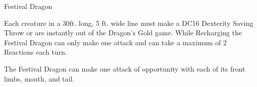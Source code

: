 \begin{DndMonster}[width=0.5\textwidth]{Festival Dragon\label{monster:FestivalDragon}}
	\DndMonsterAttack[
		name			= Tail,
		distance		= melee,	%
		mod				= -2,
		reach			= 20,
		targets			= one target,
		extra			= {Player is instantly out of the game},
	]
	
	Each creature in a 30ft. long, 5 ft. wide line must make a DC16 Dexterity Saving Throw or are instantly out of the Dragon's Gold game. While Recharging the Festival Dragon can only make one attack and can take a maximum of 2 Reactions each turn.
	
	The Festival Dragon can make one attack of opportunity with each of its front limbs, mouth, and tail.
\end{DndMonster}